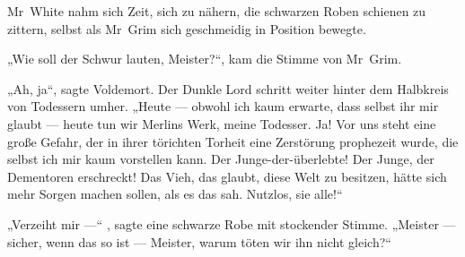 Mr~White nahm sich Zeit, sich zu nähern, die schwarzen Roben schienen zu zittern, selbst als Mr~Grim sich geschmeidig in Position bewegte.

„Wie soll der Schwur lauten, Meister?“, kam die Stimme von Mr~Grim.

„Ah, ja“, sagte Voldemort. Der Dunkle Lord schritt weiter hinter dem Halbkreis von Todessern umher.
„Heute — obwohl ich kaum erwarte, dass selbst ihr mir glaubt — heute tun wir Merlins Werk, meine Todesser. Ja! Vor uns steht eine große Gefahr, der in ihrer törichten Torheit eine Zerstörung prophezeit wurde, die selbst ich mir kaum vorstellen kann. Der Junge-der-überlebte! Der Junge, der Dementoren erschreckt! Das Vieh, das glaubt, diese Welt zu besitzen, hätte sich mehr Sorgen machen sollen, als es das sah. Nutzlos, sie alle!“

„Verzeiht mir —“ , sagte eine schwarze Robe mit stockender Stimme.
„Meister — sicher, wenn das so ist — Meister, warum töten wir ihn nicht gleich?“

